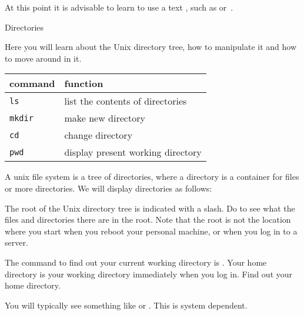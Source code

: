 At this point it is advisable to learn to use a text
, such as  or~.

 {Directories}

\begin{purpose}
  Here you will learn about the Unix directory tree, how to manipulate
  it and how to move around in it.
\end{purpose}

\begin{tabular}{ll}
  \toprule
  command&function\\
  \midrule
  \texttt{ls} & list the contents of directories\\
  \texttt{mkdir} & make new directory\\
  \texttt{cd} & change directory\\
  \texttt{pwd} & display present working directory\\
  \bottomrule
\end{tabular}

A unix file system is a tree of directories, where a directory is a
container for files or more directories. We will display directories
as follows:

\begin{comment}
  \begin{tabular}{rlr}
    \toprule
    /& &The root of the directory tree\\
    \texttt{|}&---\texttt{bin}&Binary programs\\
    \texttt{|}&---\texttt{home}&Location of user directories\\
    \bottomrule
  \end{tabular}
\end{comment}


The root of the Unix directory tree is indicated with a slash. Do
 to see what the files and directories there are in the
root. Note that the root is not the location where you start when you
reboot your personal machine, or when you log in to a server.

\begin{exercise}
  The command to find out your current working directory is
  . Your home directory is your working directory
  immediately when you log in. Find out your home directory.
\end{exercise}
\begin{outcome}
  You will typically see something like  or
  . This is system dependent.
\end{outcome}

